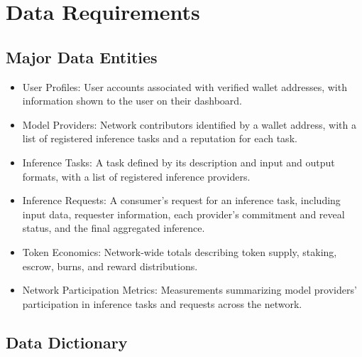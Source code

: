 \documentclass[12pt]{article}
\begin{document}

\section{Data Requirements}

\subsection{Major Data Entities}

\begin{itemize}
\item User Profiles: User accounts associated with verified wallet addresses, with information shown to the user on their dashboard.
\item Model Providers: Network contributors identified by a wallet address, with a list of registered inference tasks and a reputation for each task.
\item Inference Tasks: A task defined by its description and input and output formats, with a list of registered inference providers.
\item Inference Requests: A consumer's request for an inference task, including input data, requester information, each provider's commitment and reveal status, and the final aggregated inference.
\item Token Economics: Network-wide totals describing token supply, staking, escrow, burns, and reward distributions.
\item Network Participation Metrics: Measurements summarizing model providers' participation in inference tasks and requests across the network.
\end{itemize}

\subsection{Data Dictionary}

\end{document}
